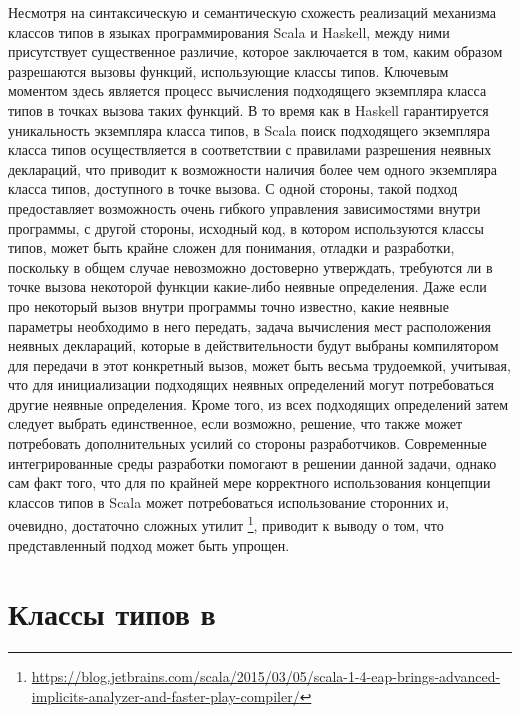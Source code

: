 Несмотря на синтаксическую и семантическую схожесть реализаций механизма классов типов в языках программирования Scala и Haskell, между ними присутствует существенное различие, которое заключается в том, каким образом разрешаются вызовы функций, использующие классы типов. Ключевым моментом здесь является процесс вычисления подходящего экземпляра класса типов в точках вызова таких функций. В то время как в Haskell гарантируется уникальность экземпляра класса типов, в Scala поиск подходящего экземпляра класса типов осуществляется в соответствии с правилами разрешения неявных деклараций, что приводит к возможности наличия более чем одного экземпляра класса типов, доступного в точке вызова. С одной стороны, такой подход предоставляет возможность очень гибкого управления зависимостями внутри программы, с другой стороны, исходный код, в котором используются классы типов, может быть крайне сложен для понимания, отладки и разработки, поскольку в общем случае невозможно достоверно утверждать, требуются ли в точке вызова некоторой функции какие-либо неявные определения. Даже если про некоторый вызов внутри программы точно известно, какие неявные параметры необходимо в него передать, задача вычисления мест расположения неявных деклараций, которые в действительности будут выбраны компилятором для передачи в этот конкретный вызов, может быть весьма трудоемкой, учитывая, что  для инициализации подходящих неявных определений могут потребоваться другие неявные определения. Кроме того, из всех подходящих определений затем следует выбрать единственное, если возможно, решение, что также может потребовать дополнительных усилий со стороны разработчиков. Современные интегрированные среды разработки помогают в решении данной задачи, однако сам факт того, что для по крайней мере корректного использования концепции классов типов в Scala может потребоваться использование сторонних и, очевидно, достаточно сложных утилит \footnote{\url{https://blog.jetbrains.com/scala/2015/03/05/scala-1-4-eap-brings-advanced-implicits-analyzer-and-faster-play-compiler/}}, приводит к выводу о том, что представленный подход может быть упрощен.    

\section{Классы типов в \cpp}

